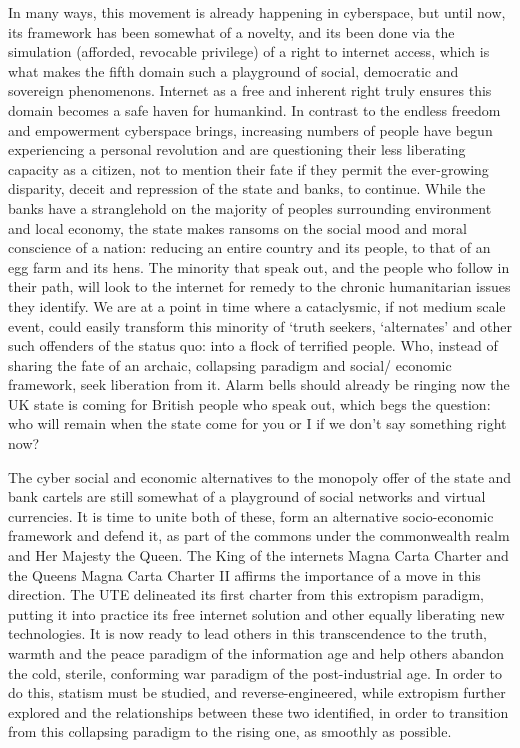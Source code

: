 \documentclass[letterpaper,10pt,openany,oneside,english]{sphinxmanual}
\begin{document}
In many ways, this movement is already happening in cyberspace, but until now, its framework has been somewhat of a novelty, and its been done via the simulation (afforded, revocable privilege) of a right to internet access, which is what makes the fifth domain such a playground of social, democratic and sovereign phenomenons. Internet as a free and inherent right truly ensures this domain becomes a safe haven for humankind. In contrast to the endless freedom and empowerment cyberspace brings, increasing numbers of people have begun experiencing a personal revolution and are questioning their less liberating capacity as a citizen, not to mention their fate if they permit the ever-growing disparity, deceit and repression of the state and banks, to continue. While the banks have a stranglehold on the majority of peoples surrounding environment and local economy, the state makes ransoms on the social mood and moral conscience of a nation: reducing an entire country and its people, to that of an egg farm and its hens. The minority that speak out, and the people who follow in their path, will look to the internet for remedy to the chronic humanitarian issues they identify. We are at a point in time where a cataclysmic, if not medium scale event, could easily transform this minority of ‘truth seekers, ‘alternates’ and other such offenders of the status quo: into a flock of terrified people. Who, instead of sharing the fate of an archaic, collapsing paradigm and social/ economic framework, seek liberation from it. Alarm bells should already be ringing now the UK state is coming for British people who speak out, which begs the question: who will remain when the state come for you or I if we don’t say something right now?

The cyber social and economic alternatives to the monopoly offer of the state and bank cartels are still somewhat of a playground of social networks and virtual currencies. It is time to unite both of these, form an alternative socio-economic framework and defend it, as part of the commons under the commonwealth realm and Her Majesty the Queen. The King of the internets Magna Carta Charter and the Queens Magna Carta Charter II affirms the importance of a move in this direction. The UTE delineated its first charter from this extropism paradigm, putting it into practice its free internet solution and other equally liberating new technologies. It is now ready to lead others in this transcendence to the truth, warmth and the peace paradigm of the information age and help others abandon the cold, sterile, conforming war paradigm of the post-industrial age. In order to do this, statism must be studied, and reverse-engineered, while extropism further explored and the relationships between these two identified, in order to transition from this collapsing paradigm to the rising one, as smoothly as possible.
\end{document}
